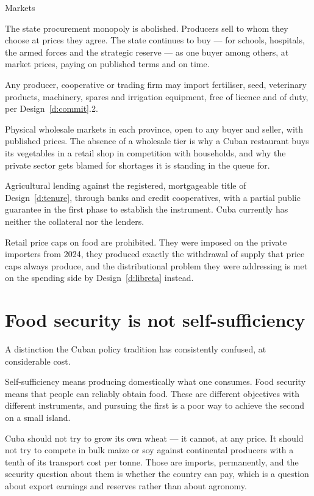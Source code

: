 \begin{design}{Markets}
\label{d:acopio}
\begin{rules}
 The state procurement monopoly is abolished. Producers sell to
whom they choose at prices they agree. The state continues to buy --- for
schools, hospitals, the armed forces and the strategic reserve --- as one buyer
among others, at market prices, paying on published terms and on time.

 Any producer, cooperative or trading firm may import
fertiliser, seed, veterinary products, machinery, spares and irrigation
equipment, free of licence and of duty, per Design~\ref{d:commit}.2.

 Physical wholesale markets in each province, open to
any buyer and seller, with published prices. The absence of a wholesale tier is
why a Cuban restaurant buys its vegetables in a retail shop in competition with
households, and why the private sector gets blamed for shortages it is standing
in the queue for.

 Agricultural lending against the registered, mortgageable
title of Design~\ref{d:tenure}, through banks and credit cooperatives, with a
partial public guarantee in the first phase to establish the instrument. Cuba
currently has neither the collateral nor the lenders.

 Retail price caps on food are prohibited. They were
imposed on the private importers from 2024, they produced exactly the withdrawal
of supply that price caps always produce, and the distributional problem they
were addressing is met on the spending side by Design~\ref{d:libreta} instead.
\end{rules}
\end{design}

\section{Food security is not self-sufficiency}

A distinction the Cuban policy tradition has consistently confused, at
considerable cost.

Self-sufficiency means producing domestically what one consumes. Food security
means that people can reliably obtain food. These are different objectives with
different instruments, and pursuing the first is a poor way to achieve the
second on a small island.

Cuba should not try to grow its own wheat --- it cannot, at any price. It should
not try to compete in bulk maize or soy against continental producers with a
tenth of its transport cost per tonne. Those are imports, permanently, and the
security question about them is whether the country can pay, which is a question
about export earnings and reserves rather than about agronomy.

